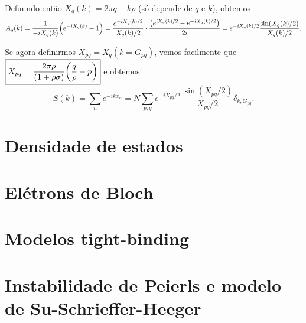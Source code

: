 \documentclass[a4paper,10pt]{article}
\begin{document}
Definindo então $X_{q}(k) = 2\pi q - k \rho$ (só depende de $q$ e $k$), obtemos
$$
A_q(k) = \frac{1}{-i X_q(k)} \qty(e^{-i X_q(k)} - 1) =
\frac{e^{-i X_q(k)/2}}{X_q(k)/2} \cdot \frac{\qty(e^{iX_q(k)/2} - e^{-iX_q(k)/2})}{2i} =
e^{-iX_q(k) / 2} \frac{\sin(X_q(k)/2)}{X_q(k)/2}.
$$

Se agora definirmos $X_{pq} = X_q(k = G_{pq})$, vemos facilmente que $\boxed{ X_{pq} = \frac{2\pi \rho}{(1+\rho\sigma)}\qty(\frac{q}{\rho} - p) }$ e obtemos
$$
\boxed{ S(k) = \sum_{n} e^{-ikx_n} = N \sum_{p,q} e^{-i X_{pq}/2} \, \frac{\sin(X_{pq}/2)}{X_{pq}/2} \delta_{k, G_{pq}}. }
$$



\pagebreak

\section{Densidade de estados}

\pagebreak

\section{Elétrons de Bloch}

\pagebreak

\section{Modelos tight-binding}

\pagebreak

\section{Instabilidade de Peierls e modelo de Su-Schrieffer-Heeger}
\end{document}
